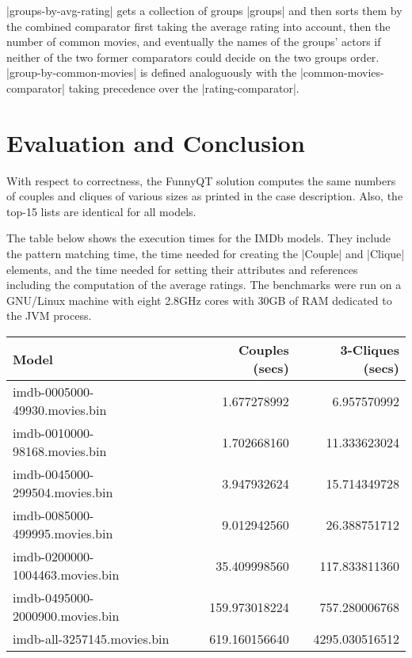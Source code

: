\documentclass[submission]{eptcs}
\newcommand{\code}{\clojureinline}
\begin{document}
\code|groups-by-avg-rating| gets a collection of groups \code|groups| and then
sorts them by the combined comparator first taking the average rating into
account, then the number of common movies, and eventually the names of the
groups' actors if neither of the two former comparators could decide on the two
groups order.  \code|group-by-common-movies| is defined analoguously with the
\code|common-movies-comparator| taking precedence over the
\code|rating-comparator|.


\section{Evaluation and Conclusion}
\label{sec:evaluation}

With respect to correctness, the FunnyQT solution computes the same numbers of
couples and cliques of various sizes as printed in the case description.  Also,
the top-15 lists are identical for all models.

The table below shows the execution times for the IMDb models.  They include
the pattern matching time, the time needed for creating the \code|Couple| and
\code|Clique| elements, and the time needed for setting their attributes and
references including the computation of the average ratings.  The benchmarks
were run on a GNU/Linux machine with eight 2.8GHz cores with 30GB of RAM
dedicated to the JVM process.

{\footnotesize
  \begin{center}
    \begin{tabular}{| l | r | r |}
      \hline
      \textbf{Model}                  & \textbf{Couples (secs)} & \textbf{3-Cliques (secs)}\\
      \hline
      imdb-0005000-49930.movies.bin   &   1.677278992    &        6.957570992\\
      imdb-0010000-98168.movies.bin   &   1.702668160    &        11.333623024\\
      imdb-0045000-299504.movies.bin  &   3.947932624    &        15.714349728\\
      imdb-0085000-499995.movies.bin  &   9.012942560    &        26.388751712\\
      imdb-0200000-1004463.movies.bin &   35.409998560   &        117.833811360\\
      imdb-0495000-2000900.movies.bin &   159.973018224  &        757.280006768\\
      imdb-all-3257145.movies.bin     &   619.160156640  &        4295.030516512\\
      \hline
    \end{tabular}
  \end{center}}
\end{document}

